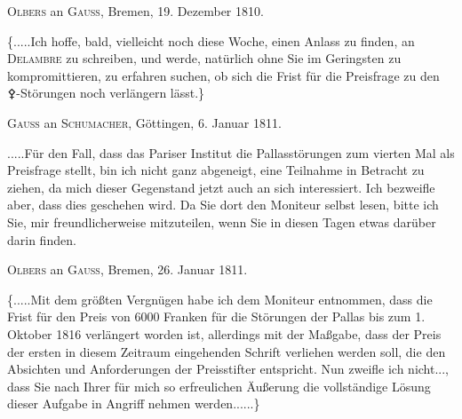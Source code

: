\par\bigskip
{}
\begin{center}
\textsc{Olbers} an \textsc{Gauss}, Bremen, 19. Dezember 1810.
\end{center}
\noindent\hspace*{\parindent}\{.\quad.\quad.\quad.\quad.\quad Ich hoffe, bald, vielleicht noch diese Woche, einen Anlass zu finden, an \textsc{Delambre} zu schreiben, und werde, natürlich ohne Sie im Geringsten zu kompromittieren, zu erfahren suchen, ob sich die Frist für die Preisfrage zu den {\AstroSymbols ⚴}-Störungen noch verlängern lässt.\}
\par{}\bigskip
\begin{center}
\textsc{Gauss} an \textsc{Schumacher}, Göttingen, 6. Januar 1811.
\end{center}
\noindent\hspace*{\parindent}.\quad.\quad.\quad.\quad.\quad Für den Fall, dass das Pariser Institut die Pallasstörungen zum vierten Mal als Preisfrage stellt, bin ich nicht ganz abgeneigt, eine Teilnahme in Betracht zu ziehen, da mich dieser Gegenstand jetzt auch an sich interessiert. Ich bezweifle aber, dass dies geschehen wird. Da Sie dort den Moniteur selbst lesen, bitte ich Sie, mir freundlicherweise mitzuteilen, wenn Sie in diesen Tagen etwas darüber darin finden.
\par\bigskip
\begin{center}
\textsc{Olbers} an \textsc{Gauss}, Bremen, 26. Januar 1811.
\end{center}
\noindent\hspace*{\parindent}\{.\quad.\quad.\quad.\quad.\quad Mit dem größten Vergnügen habe ich dem Moniteur entnommen, dass die Frist für den Preis von 6000 Franken für die Störungen der Pallas bis zum 1. Oktober 1816 verlängert worden ist, allerdings mit der Maßgabe, dass der Preis der ersten in diesem Zeitraum eingehenden Schrift verliehen werden soll, die den Absichten und Anforderungen der Preisstifter entspricht. Nun zweifle ich nicht\quad.\quad.\quad., dass Sie nach Ihrer für mich so erfreulichen Äußerung die vollständige Lösung dieser Aufgabe in Angriff nehmen werden.\quad.\quad.\quad.\quad.\quad.\}
\par
